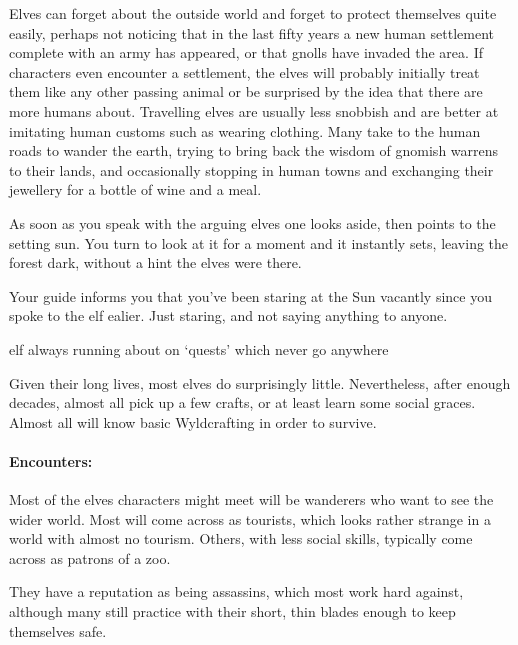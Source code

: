 \begin{multicols}{2}
\begin{boxtext}
\end{boxtext}

Elves can forget about the outside world and forget to protect themselves quite easily, perhaps not noticing that in the last fifty years a new human settlement complete with an army has appeared, or that gnolls have invaded the area.
If characters even encounter a settlement, the elves will probably initially treat them like any other passing animal or be surprised by the idea that there are more humans about.
Travelling elves are usually less snobbish and are better at imitating human customs such as wearing clothing.
Many take to the human roads to wander the earth, trying to bring back the wisdom of gnomish warrens to their lands, and occasionally stopping in human towns and exchanging their jewellery for a bottle of wine and a meal.

\begin{boxtext}

  As soon as you speak with the arguing elves one looks aside, then points to the setting sun.
  You turn to look at it for a moment and it instantly sets, leaving the forest dark, without a hint the elves were there.

  Your guide informs you that you've been staring at the Sun vacantly since you spoke to the elf ealier.
  Just staring, and not saying anything to anyone.

\end{boxtext}


  {elf}%
  {always running about on `quests' which never go anywhere}%

Given their long lives, most elves do surprisingly little.
Nevertheless, after enough decades, almost all pick up a few crafts, or at least learn some social graces.
Almost all will know basic Wyldcrafting in order to survive.

\paragraph{Encounters:}
Most of the elves characters might meet will be wanderers who want to see the wider world.
Most will come across as tourists, which looks rather strange in a world with almost no tourism.
Others, with less social skills, typically come across as patrons of a zoo.

They have a reputation as being assassins, which most work hard against, although many still practice with their short, thin blades enough to keep themselves safe.


\end{multicols}
